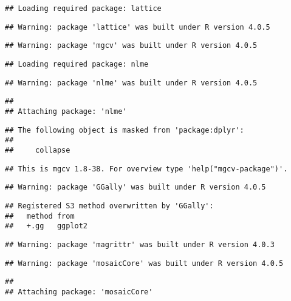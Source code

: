 \documentclass[
]{article}
\begin{document}
\begin{verbatim}
## Loading required package: lattice
\end{verbatim}

\begin{verbatim}
## Warning: package 'lattice' was built under R version 4.0.5
\end{verbatim}

\begin{verbatim}
## Warning: package 'mgcv' was built under R version 4.0.5
\end{verbatim}

\begin{verbatim}
## Loading required package: nlme
\end{verbatim}

\begin{verbatim}
## Warning: package 'nlme' was built under R version 4.0.5
\end{verbatim}

\begin{verbatim}
## 
## Attaching package: 'nlme'
\end{verbatim}

\begin{verbatim}
## The following object is masked from 'package:dplyr':
## 
##     collapse
\end{verbatim}

\begin{verbatim}
## This is mgcv 1.8-38. For overview type 'help("mgcv-package")'.
\end{verbatim}

\begin{verbatim}
## Warning: package 'GGally' was built under R version 4.0.5
\end{verbatim}

\begin{verbatim}
## Registered S3 method overwritten by 'GGally':
##   method from   
##   +.gg   ggplot2
\end{verbatim}

\begin{verbatim}
## Warning: package 'magrittr' was built under R version 4.0.3
\end{verbatim}

\begin{verbatim}
## Warning: package 'mosaicCore' was built under R version 4.0.5
\end{verbatim}

\begin{verbatim}
## 
## Attaching package: 'mosaicCore'
\end{verbatim}
\end{document}
